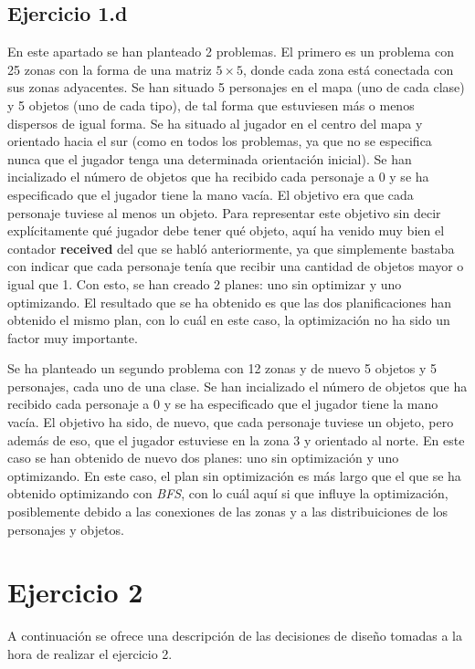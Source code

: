 \documentclass[11pt,a4paper]{article}
\begin{document}
\subsection{Ejercicio 1.d}

En este apartado se han planteado 2 problemas. El primero es un problema con 25 zonas con la forma de una matriz $5 \times 5$, donde
cada zona está conectada con sus zonas adyacentes. Se han situado 5 personajes en el mapa (uno de cada clase) y 5 objetos (uno de cada
tipo), de tal forma que estuviesen más o menos dispersos de igual forma. Se ha situado al jugador en el centro del mapa y orientado
hacia el sur (como en todos los problemas, ya que no se especifica nunca que el jugador tenga una determinada orientación inicial).
Se han incializado el número de objetos que ha recibido cada personaje a 0 y se ha especificado que el jugador tiene la mano vacía.
El objetivo era que cada personaje tuviese al menos un objeto. Para representar este objetivo sin decir explícitamente qué jugador
debe tener qué objeto, aquí ha venido muy bien el contador \textbf{received} del que se habló anteriormente, ya que simplemente
bastaba con indicar que cada personaje tenía que recibir una cantidad de objetos mayor o igual que 1. Con esto, se han creado 2
planes: uno sin optimizar y uno optimizando. El resultado que se ha obtenido es que las dos planificaciones han obtenido el mismo
plan, con lo cuál en este caso, la optimización no ha sido un factor muy importante.

Se ha planteado un segundo problema con 12 zonas y de nuevo 5 objetos y 5 personajes, cada uno de una clase. 
Se han incializado el número de objetos que ha recibido cada personaje a 0 y se ha especificado que el jugador tiene la mano vacía.
El objetivo ha sido, de
nuevo, que cada personaje tuviese un objeto, pero además de eso, que el jugador estuviese en la zona 3 y orientado al norte. En este
caso se han obtenido de nuevo dos planes: uno sin optimización y uno optimizando. En este caso, el plan sin optimización es más largo
que el que se ha obtenido optimizando con \textit{BFS}, con lo cuál aquí si que influye la optimización, posiblemente debido a las
conexiones de las zonas y a las distribuiciones de los personajes y objetos.

\section{Ejercicio 2}

A continuación se ofrece una descripción de las decisiones de diseño tomadas a la hora de realizar el ejercicio 2.
\end{document}
